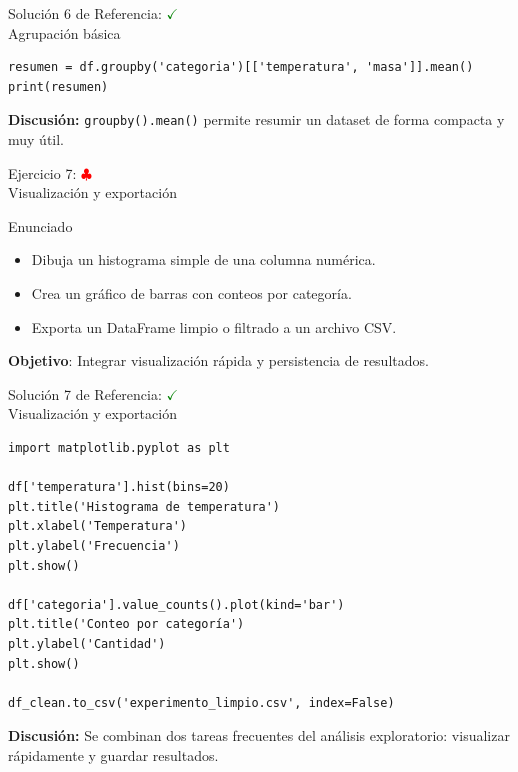 \documentclass[10pt]{beamer}
\begin{document}
\begin{solutionblock}
\begin{frame}[fragile]{Solución 6 de Referencia: \hfill \textcolor{green}{$\checkmark$} \\ Agrupación básica}
\begin{verbatim}
resumen = df.groupby('categoria')[['temperatura', 'masa']].mean()
print(resumen)
\end{verbatim}
\textbf{Discusión:} \texttt{groupby().mean()} permite resumir un dataset de forma compacta y muy útil.
\end{frame}
\end{solutionblock}

\begin{frame}{Ejercicio 7: \hfill \textcolor{red}{$\clubsuit$} \\ Visualización y exportación}
  \begin{block}{Enunciado}
    \begin{itemize}
      \item Dibuja un histograma simple de una columna numérica.
      \item Crea un gráfico de barras con conteos por categoría.
      \item Exporta un DataFrame limpio o filtrado a un archivo CSV.
    \end{itemize}
  \end{block}
  \textbf{Objetivo}: Integrar visualización rápida y persistencia de resultados.
\end{frame}

\begin{solutionblock}
\begin{frame}[fragile]{Solución 7 de Referencia: \hfill \textcolor{green}{$\checkmark$} \\ Visualización y exportación}
\begin{verbatim}
import matplotlib.pyplot as plt

df['temperatura'].hist(bins=20)
plt.title('Histograma de temperatura')
plt.xlabel('Temperatura')
plt.ylabel('Frecuencia')
plt.show()

df['categoria'].value_counts().plot(kind='bar')
plt.title('Conteo por categoría')
plt.ylabel('Cantidad')
plt.show()

df_clean.to_csv('experimento_limpio.csv', index=False)
\end{verbatim}
\textbf{Discusión:} Se combinan dos tareas frecuentes del análisis exploratorio: visualizar rápidamente y guardar resultados.
\end{frame}
\end{solutionblock}
\end{document}
